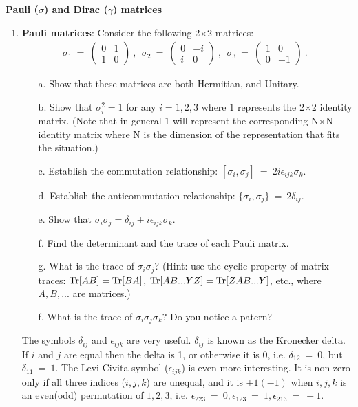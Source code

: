 \documentclass[12pt]{article}
\def \bea{\begin{eqnarray}}
\def \eea{\end{eqnarray}}
\def \bmat{\begin{matrix}}
\def \emat{\end{matrix}}
\def \({\left(}
\def \){\right)}
\def \bma{\(\bmat}
\def \ema{\emat\)}
\def \Tr{{\rm Tr}}
\def \de{\delta}
\def \ep{\epsilon}
\def \si{\sigma}
\def \1{1}%
\begin{document}
\begin{center}
\underline{\textbf{\Large Pauli ($\si$) and Dirac ($\gamma$) matrices}}
\end{center}

\begin{enumerate}

\item {\bf Pauli matrices}: Consider the following 2$\times$2 matrices:
\bea
\si_1 ~=~ \bma 0 & 1 \\ 1 & 0 \ema ~,~~ \si_2 ~=~ \bma 0 & -i \\ i & 0 \ema ~,~~
\si_3 ~=~ \bma 1 & 0 \\ 0 & -1 \ema ~.~~
\eea
\begin{enumerate}
  \item [a.] Show that these matrices are both Hermitian, and Unitary.
  \item [b.] Show that $\si^2_i = \1$ for any $i = 1, 2, 3$ where $\1$ represents the
  2$\times$2 identity matrix. (Note that in general $\1$ will represent the
  corresponding N$\times$N identity matrix where N is the dimension of the representation
  that fits the situation.)
  \item [c.] Establish the commutation relationship: $[\si_i, \si_j] ~=~ 2 i
  \ep_{ijk}\si_k$.
  \item [d.] Establish the anticommutation relationship: $\{\si_i,\si_j\} ~=~ 2\de
  _{ij}$.
  \item [e.] Show that $\si_i\si_j = \de_{ij} + i \ep_{ijk}\si_k$.
  \item [f.] Find the determinant and the trace of each Pauli matrix.
  \item [g.] What is the trace of $\si_i\si_j$? (Hint: use the cyclic property of
  matrix traces: $\Tr[AB] = \Tr[BA]$, $\Tr[AB...YZ] = \Tr[ZAB...Y]$, etc., where $A,
  B, ...$ are matrices.)
  \item [f.] What is the trace of $\si_i\si_j\si_k$? Do you notice a patern?
\end{enumerate}
The symbols $\de_{ij}$ and $\ep_{ijk}$ are very useful. $\de_{ij}$ is known as
the Kronecker delta. If $i$ and $j$ are equal then the delta is 1, or otherwise
it is 0, i.e. $\de_{12} ~=~ 0$, but $\de_{11} ~=~ 1$. The Levi-Civita symbol
($\ep_{ijk}$) is even more interesting. It is non-zero only if all three indices
($i, j, k$) are unequal, and it is $+1(-1)$ when $i, j, k$ is an even(odd) permutation
of $1, 2, 3$, i.e. $\ep_{223} ~=~ 0, \ep_{123} ~=~ 1, \ep_{213} ~=~ -1$.


\end{enumerate}
\end{document}
